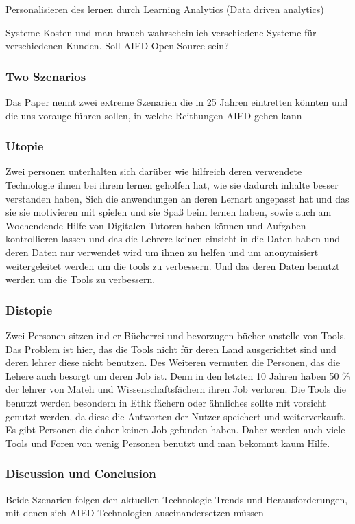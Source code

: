 Personalisieren des lernen durch Learning Analytics (Data driven analytics)

Systeme Kosten und man brauch wahrscheinlich verschiedene Systeme für verschiedenen Kunden. Soll AIED Open Source sein?




\subsubsection{Two Szenarios}
Das Paper nennt zwei extreme Szenarien die in 25 Jahren eintretten könnten und die uns vorauge führen sollen, in welche Rcithungen AIED gehen kann

\subsubsection{Utopie}
Zwei personen unterhalten sich darüber wie hilfreich deren verwendete Technologie ihnen bei ihrem
lernen geholfen hat, wie sie dadurch inhalte besser verstanden haben, Sich die anwendungen an deren Lernart angepasst hat und das sie sie motivieren mit spielen und sie Spaß beim lernen haben, sowie auch am Wochendende Hilfe von Digitalen Tutoren haben können und Aufgaben kontrollieren lassen
und das die Lehrere keinen einsicht in die Daten haben und deren Daten nur verwendet wird um ihnen zu helfen und um anonymisiert weitergeleitet werden um die tools zu verbessern. Und das deren Daten benutzt werden um die Tools zu verbessern.


\subsubsection{Distopie}
Zwei Personen sitzen ind er Bücherrei und bevorzugen bücher anstelle von Tools. Das Problem ist hier, das die Tools nicht für deren Land ausgerichtet sind und deren lehrer diese nicht benutzen. 
Des Weiteren vermuten die Personen, das die Lehere auch besorgt um deren Job ist. Denn in den letzten 10 Jahren haben 50 \% der lehrer von Mateh und Wissenschaftsfächern ihren Job verloren.
Die Tools die benutzt werden besondern in Ethk fächern oder ähnliches sollte mit vorsicht genutzt werden, da diese die Antworten der Nutzer speichert und weiterverkauft. Es gibt Personen die daher keinen Job gefunden haben.
Daher werden auch viele Tools und Foren von wenig Personen benutzt und man bekommt kaum Hilfe.

\subsubsection{Discussion und Conclusion}
Beide Szenarien folgen den aktuellen Technologie Trends und Herausforderungen, mit denen sich AIED Technologien auseinandersetzen müssen

